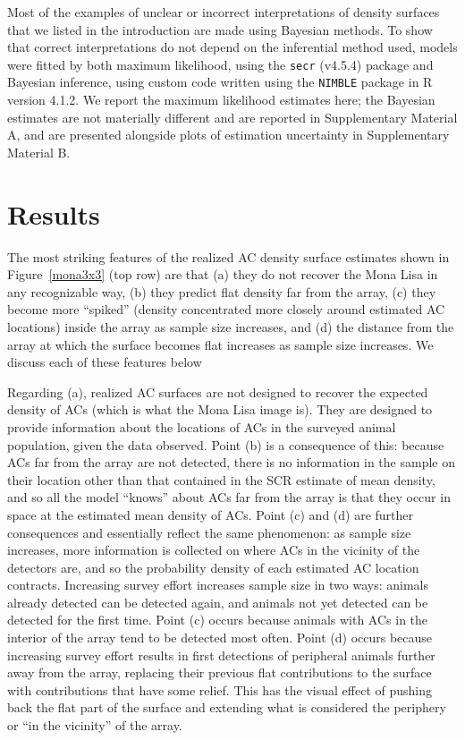 \documentclass[useAMS,usenatbib,referee]{biom}
\begin{document}
Most of the examples of unclear or incorrect interpretations of density surfaces that we listed in the introduction are made using Bayesian methods. To show that correct interpretations do not depend on the inferential method used, models were fitted by both maximum likelihood, using the \texttt{secr} (v4.5.4) package \citep{secr:22} and Bayesian inference, using custom code written using the \texttt{NIMBLE} package \citep{deValpine:17, Turek:21} in R version 4.1.2. We report the maximum likelihood estimates here; the Bayesian estimates are not materially different and are reported in Supplementary Material A, and are presented alongside plots of estimation uncertainty in Supplementary Material B.

\section{Results}
The most striking features of the realized AC density surface estimates shown in Figure~\ref{mona3x3} (top row) are that (a) they do not recover the Mona Lisa in any recognizable way, (b) they predict flat density far from the array, (c) they become more ``spiked'' (density concentrated more closely around estimated AC locations) inside the array as sample size increases, and (d) the distance from the array at which the surface becomes flat increases as sample size increases. We discuss each of these features below

Regarding (a), realized AC surfaces are not designed to recover the expected density of ACs (which is what the Mona Lisa image is). They are designed to provide information about the locations of ACs in the surveyed animal population, given the data observed. Point (b) is a consequence of this: because ACs far from the array are not detected, there is no information in the sample on their location other than that contained in the SCR estimate of mean density, and so all the model ``knows'' about ACs far from the array is that they occur in space at the estimated mean density of ACs. Point (c) and (d) are further consequences and essentially reflect the same phenomenon: as sample size increases, more information is collected on where ACs in the vicinity of the detectors are, and so the probability density of each estimated AC location contracts. Increasing survey effort increases sample size in two ways: animals already detected can be detected again, and animals not yet detected can be detected for the first time. Point (c) occurs because animals with ACs in the interior of the array tend to be detected most often. Point (d) occurs because increasing survey effort results in first detections of peripheral animals further away from the array, replacing their previous flat contributions to the surface with contributions that have some relief. This has the visual effect of pushing back the flat part of the surface and extending what is considered the periphery or ``in the vicinity'' of the array. 
\end{document}
